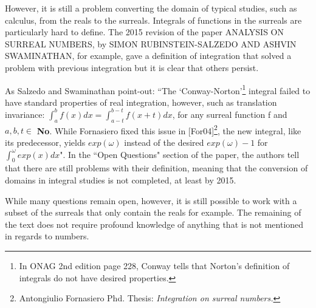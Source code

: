 However, it is still a problem converting the domain of typical studies, such as calculus, from the reals to the surreals. Integrals of functions in the surreals are particularly hard to define. The 2015 revision of the paper ANALYSIS ON SURREAL NUMBERS, by SIMON RUBINSTEIN-SALZEDO AND ASHVIN SWAMINATHAN, for example, gave a definition of integration that solved a problem with previous integration but it is clear that others persist.

As Salzedo and Swaminathan point-out: ``The `Conway-Norton'\footnote{In ONAG 2nd edition page 228, Conway  tells that Norton's definition of integrals do not have desired properties.}
integral failed to have standard properties of real integration, however, such as translation
invariance: $\int_a^bf(x)dx = \int_{a-t}^{b-t}f(x+t)dx$, for any surreal function f and $a,b,t\in$ \textbf{No}. While Fornasiero fixed this issue in [For04]\footnote{Antongiulio Fornasiero Phd. Thesis: \textit{Integration on surreal numbers.}}, the new integral, like its predecessor, yields
$exp(\omega)$ instead of the desired $exp(\omega)-1$ for $\int_0^{\omega}exp(x)dx$". In the ``Open Questions" section of  the paper, the authors tell that there are still problems with their definition, meaning that the conversion of domains in integral studies is not completed, at least by 2015.

While many questions remain open, however, it is still possible to work with a subset of the surreals that only contain the reals for example. The remaining of the text does not require profound knowledge of anything that is not mentioned in regards to numbers.









